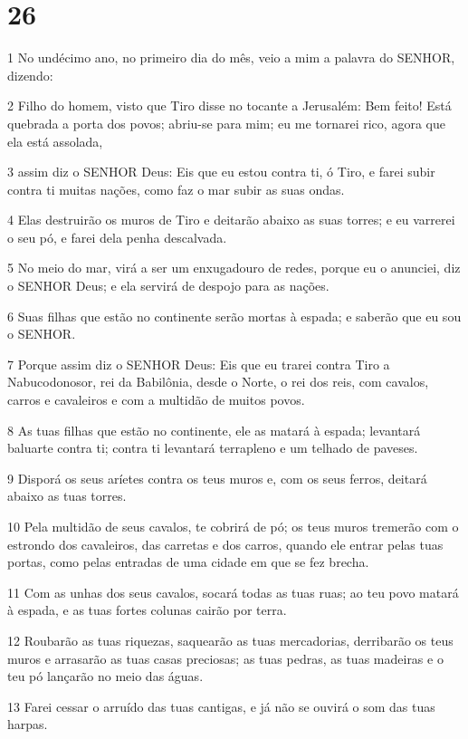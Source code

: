 \chapter{26}

\par 1 No undécimo ano, no primeiro dia do mês, veio a mim a palavra do SENHOR, dizendo:
\par 2 Filho do homem, visto que Tiro disse no tocante a Jerusalém: Bem feito! Está quebrada a porta dos povos; abriu-se para mim; eu me tornarei rico, agora que ela está assolada,
\par 3 assim diz o SENHOR Deus: Eis que eu estou contra ti, ó Tiro, e farei subir contra ti muitas nações, como faz o mar subir as suas ondas.
\par 4 Elas destruirão os muros de Tiro e deitarão abaixo as suas torres; e eu varrerei o seu pó, e farei dela penha descalvada.
\par 5 No meio do mar, virá a ser um enxugadouro de redes, porque eu o anunciei, diz o SENHOR Deus; e ela servirá de despojo para as nações.
\par 6 Suas filhas que estão no continente serão mortas à espada; e saberão que eu sou o SENHOR.
\par 7 Porque assim diz o SENHOR Deus: Eis que eu trarei contra Tiro a Nabucodonosor, rei da Babilônia, desde o Norte, o rei dos reis, com cavalos, carros e cavaleiros e com a multidão de muitos povos.
\par 8 As tuas filhas que estão no continente, ele as matará à espada; levantará baluarte contra ti; contra ti levantará terrapleno e um telhado de paveses.
\par 9 Disporá os seus aríetes contra os teus muros e, com os seus ferros, deitará abaixo as tuas torres.
\par 10 Pela multidão de seus cavalos, te cobrirá de pó; os teus muros tremerão com o estrondo dos cavaleiros, das carretas e dos carros, quando ele entrar pelas tuas portas, como pelas entradas de uma cidade em que se fez brecha.
\par 11 Com as unhas dos seus cavalos, socará todas as tuas ruas; ao teu povo matará à espada, e as tuas fortes colunas cairão por terra.
\par 12 Roubarão as tuas riquezas, saquearão as tuas mercadorias, derribarão os teus muros e arrasarão as tuas casas preciosas; as tuas pedras, as tuas madeiras e o teu pó lançarão no meio das águas.
\par 13 Farei cessar o arruído das tuas cantigas, e já não se ouvirá o som das tuas harpas.
